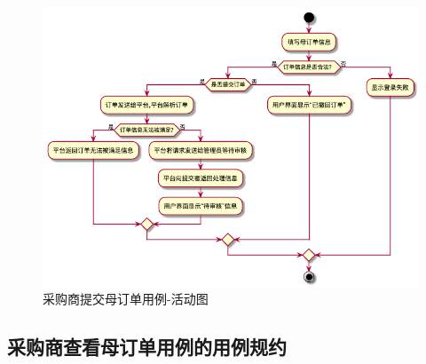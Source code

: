 \begin{figure}[htp]
    \centering
    \includegraphics[width=12cm]{image/chap01/uc_client_submit_request.png}
    \caption{采购商提交母订单用例-活动图}
    \label{fig:put-mon-order-uml}
\end{figure}



\subsection{采购商查看母订单用例的用例规约}

